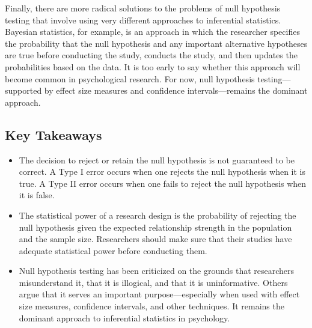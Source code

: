 Finally, there are more radical solutions to the problems of null hypothesis testing that involve using very different approaches to inferential statistics. Bayesian statistics, for example, is an approach in which the researcher specifies the probability that the null hypothesis and any important alternative hypotheses are true before conducting the study, conducts the study, and then updates the probabilities based on the data. It is too early to say whether this approach will become common in psychological research. For now, null hypothesis testing---supported by effect size measures and confidence intervals---remains the dominant approach.

\subsection{Key Takeaways}
\begin{fullwidth}
\begin{itemize}
\item The decision to reject or retain the null hypothesis is not guaranteed to be correct. A Type I error occurs when one rejects the null hypothesis when it is true. A Type II error occurs when one fails to reject the null hypothesis when it is false.

\item The statistical power of a research design is the probability of rejecting the null hypothesis given the expected relationship strength in the population and the sample size. Researchers should make sure that their studies have adequate statistical power before conducting them.

\item Null hypothesis testing has been criticized on the grounds that researchers misunderstand it, that it is illogical, and that it is uninformative. Others argue that it serves an important purpose---especially when used with effect size measures, confidence intervals, and other techniques. It remains the dominant approach to inferential statistics in psychology.

\end{itemize}
\end{fullwidth}



